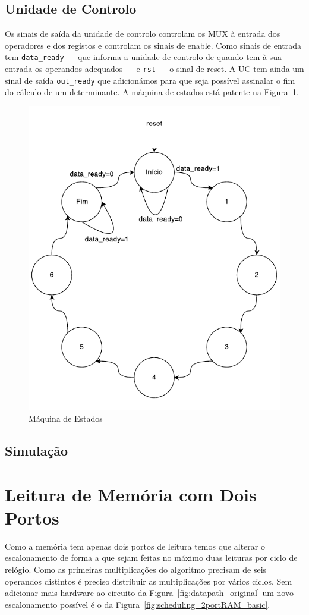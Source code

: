 \documentclass[a4paper]{article}
\begin{document}
\subsection{Unidade de Controlo}

Os sinais de saída da unidade de controlo controlam os MUX à entrada dos operadores e dos registos e controlam os sinais de enable. Como sinais de entrada tem \texttt{data\_ready} --- que informa a unidade de controlo de quando tem à sua entrada os operandos adequados --- e \texttt{rst} --- o sinal de reset. A UC tem ainda um sinal de saída \texttt{out\_ready} que adicionámos para que seja possível assinalar o fim do cálculo de um determinante. A máquina de estados está patente na Figura~\ref{fig:statemachine}.

\begin{figure}[h]
	\centering
	\includegraphics[width=0.4\linewidth]{schem_sm}
	\caption{Máquina de Estados}
	\label{fig:statemachine}
\end{figure}

\subsection{Simulação}

\section{Leitura de Memória com Dois Portos}
\label{sec:leitura_mem_2portos}

Como a memória tem apenas dois portos de leitura temos que alterar o escalonamento de forma a que sejam feitas no máximo duas leituras por ciclo de relógio. Como as primeiras multiplicações do algoritmo precisam de seis operandos distintos é preciso distribuir as multiplicações por vários ciclos. Sem adicionar mais hardware ao circuito da Figura~\ref{fig:datapath_original} um novo escalonamento possível é o da Figura~\ref{fig:scheduling_2portRAM_basic}.
\end{document}
